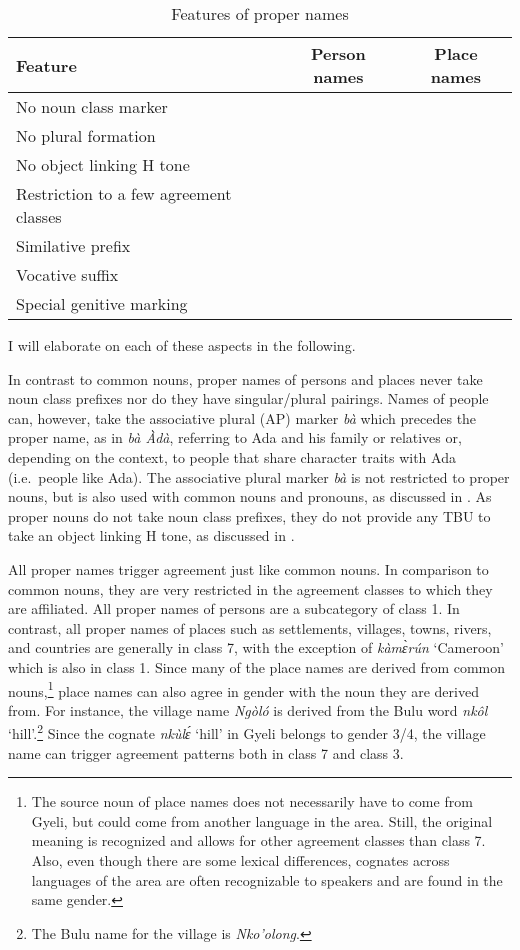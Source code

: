 \begin{table} 
\centering
\begin{tabular}{l|cc}
 \midrule
Feature		& 					Person names	& Place names \\
 \midrule
No noun class marker		& 			\checkmark		& 		\checkmark	\\
No plural formation			& 			\checkmark		&		\checkmark	\\
No object linking H tone		& 			\checkmark		& 		\checkmark	\\
Restriction to a few agreement classes & 		\checkmark		& 		\checkmark	\\   
\hdashline[0.6pt/4pt]
Similative prefix 			& 			\checkmark		& 			\\
Vocative suffix				& 			\checkmark		& 			\\
Special genitive marking		& 			\checkmark		& 			\\
 \midrule
\end{tabular}
\caption{Features of proper names}
\label{Tab:PropName}
\end{table}


 \noindent I will elaborate on each of these aspects in the following. 

In contrast to common nouns, proper names of persons and places never take noun class prefixes nor do they have singular/plural pairings. Names of people can, however, take the associative plural (AP) marker {\itshape bà} which precedes the proper name, as in {\itshape bà Àdà}, referring to Ada and his family or relatives or, depending on the context, to people that share character traits with Ada (i.e.\ people like Ada). The associative plural marker {\itshape bà} is not restricted to proper nouns, but is also used with common nouns and pronouns, as discussed in . As proper nouns do not take noun class prefixes, they do not provide any TBU to take an object linking H tone, as discussed in .

All proper names trigger agreement just like common nouns. In comparison to common nouns, they are very restricted in the agreement classes to which they are affiliated. 
All proper names of persons are a subcategory of class 1. In contrast, all proper names of places such as settlements, villages, towns, rivers, and countries are generally in class 7, with the exception of {\itshape kàmɛ̀rún} `Cameroon' which is also in class 1. Since many of the place names are derived from common nouns,\footnote{The source noun of place names does not necessarily have to come from Gyeli, but could come from another language in the area. Still, the original meaning is recognized and allows for other agreement classes than class 7. Also, even though there are some lexical differences, cognates across languages of the area are often recognizable to speakers and are found in the same gender.}  place names can also agree in gender with the noun they are derived from. For instance,  the village name {\itshape Ngòló} is derived from the Bulu word {\itshape nkôl} `hill'.\footnote{The Bulu name for the village is  {\itshape Nko'olong}.}  %
Since the cognate {\itshape nkùlɛ́ }`hill' in Gyeli belongs to gender 3/4, the village name can trigger agreement patterns both in class 7 and class 3.

